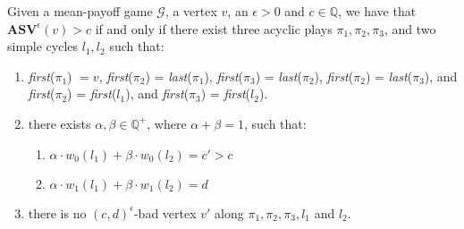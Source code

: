 \begin{lemma}
\label{LemPlaysAsWitnessForASV}
Given a mean-payoff game $\mathcal{G}$, a vertex $v$, an $\epsilon > 0$ and $c \in \mathbb{Q}$, we have that  $\mathbf{ASV}^{\epsilon}(v) > c$ if and only if there exist three acyclic plays $\pi_1, \pi_2, \pi_3$, and two simple cycles $l_1 , l_2$ such that:
\begin{enumerate}
    \item \textit{first}($\pi_1$) $ = v$, \textit{first}($\pi_2$) = \textit{last}($\pi_1$), \textit{first}($\pi_3$) = \textit{last}($\pi_2$), \textit{first}($\pi_2$) = \textit{last}($\pi_3$), and \textit{first}($\pi_2$) = \textit{first}($l_1$), and \textit{first}($\pi_3$) = \textit{first}($l_2$).
    \item there exists $\alpha, \beta \in \mathbb{Q}^{+}$, where $\alpha + \beta = 1$, such that:
    \begin{enumerate}
        \item $\alpha \cdot w_0(l_1) + \beta \cdot w_0(l_2) = c' > c$
        \item $\alpha \cdot w_1(l_1) + \beta \cdot w_1(l_2) = d$
    \end{enumerate}
    \item there is no $(c,d)^{\epsilon}$-bad vertex $v'$ along $\pi_1, \pi_2, \pi_3, l_1$ and $l_2$.
\end{enumerate}
\end{lemma}
